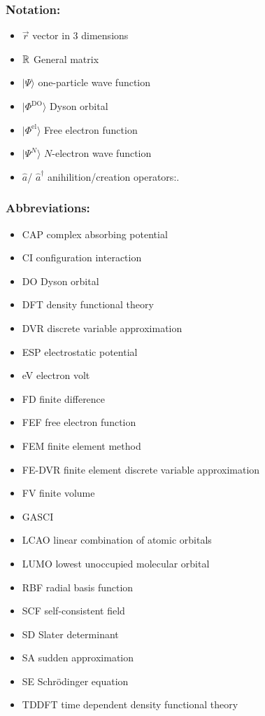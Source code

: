 \subsubsection{Notation:}
\begin{itemize}
   \item $\vec{r}$ vector in $3$ dimensions
   \item $\mathbb{R}$ General matrix
   \item $|\Psi\rangle$ one-particle wave function
   \item $|\Phi^\text{DO}\rangle$ Dyson orbital
   \item $|\Phi^\text{el}\rangle$ Free electron function
   \item $|\Psi^N\rangle$ $N$-electron wave function
   \item  $\hat{a}$/ $\hat{a}^\dagger$ anihilition/creation operators:.
\end{itemize}

\subsubsection{Abbreviations:}
\begin{itemize}
   \item CAP complex absorbing potential
   \item CI configuration interaction
   \item DO Dyson orbital
   \item DFT density functional theory
   \item DVR discrete variable approximation
   \item ESP electrostatic potential
   \item eV electron volt
   \item FD finite difference
   \item FEF free electron function
   \item FEM finite element method
   \item FE-DVR finite element discrete variable approximation
   \item FV finite volume
   \item GASCI 
   \item LCAO linear combination of atomic orbitals
   \item LUMO lowest unoccupied molecular orbital
   \item RBF radial basis function
   \item SCF self-consistent field
   \item SD Slater determinant
   \item SA sudden approximation
   \item SE Schr\"odinger equation
   \item TDDFT time dependent density functional theory
\end{itemize}

